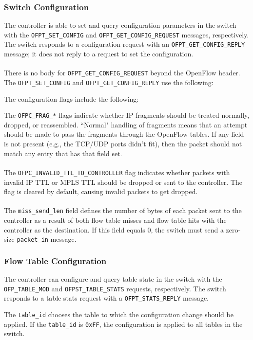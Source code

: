 \subsubsection{Switch Configuration}
The controller is able to set and query configuration parameters in the switch with the \verb|OFPT_SET_CONFIG| and \verb|OFPT_GET_CONFIG_REQUEST| messages, respectively.  The switch responds to a configuration request with an \verb|OFPT_GET_CONFIG_REPLY| message; it does not reply to a request to set the configuration.  
\\\\
There is no body for \verb|OFPT_GET_CONFIG_REQUEST| beyond the OpenFlow header.  The \verb|OFPT_SET_CONFIG| and \verb|OFPT_GET_CONFIG_REPLY| use the following:


The configuration flags include the following:


The \verb|OFPC_FRAG_*| flags indicate whether IP fragments should be treated normally, dropped, or reassembled.  ``Normal" handling of fragments means that an attempt should be made to pass the fragments through the OpenFlow tables. If any field is not present (e.g., the TCP/UDP ports didn't fit), then the packet should not match any entry that has that field set.
\\\\
The \verb|OFPC_INVALID_TTL_TO_CONTROLLER| flag indicates whether packets with invalid IP TTL or MPLS TTL should be dropped or sent to the controller.  The flag is cleared by default, causing invalid packets to get dropped.
\\\\
The \verb|miss_send_len| field defines the number of bytes of each packet sent to the controller as a result of both flow table misses and flow table hits with the controller as the destination.  If this field equals 0, the switch must send a zero-size \verb|packet_in| message.

\subsubsection{Flow Table Configuration}
The controller can configure and query table state in the switch with the \verb|OFP_TABLE_MOD| and \verb|OFPST_TABLE_STATS| requests, respectively. The switch responds to a table stats request with a \verb|OFPT_STATS_REPLY| message.


The \verb|table_id| chooses the table to which the configuration change should be applied. If the \verb|table_id| is \verb|0xFF|, the configuration is applied to all tables in the switch.


